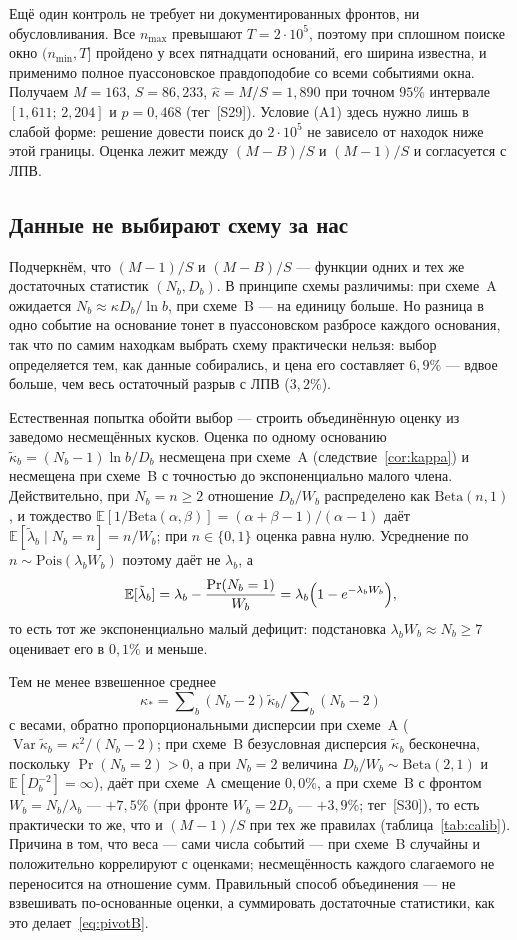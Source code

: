 \documentclass[11pt,a4paper]{article}
\theoremstyle{plain}
\theoremstyle{remark}
\begin{document}
Ещё один контроль не требует ни документированных фронтов, ни обусловливания. Все
$n_{\max}$ превышают $T=2\cdot10^5$, поэтому при сплошном поиске окно
$(n_{\min},T]$ пройдено у всех пятнадцати оснований, его ширина известна, и
применимо полное пуассоновское правдоподобие со всеми событиями окна. Получаем
$M=163$, $S=86{,}233$, $\hat\kappa=M/S=1{,}890$ при точном $95\%$ интервале
$[1{,}611;\,2{,}204]$ и $p=0{,}468$ (тег~[S29]). Условие (A1) здесь нужно лишь в
слабой форме: решение довести поиск до $2\cdot10^5$ не зависело от находок ниже
этой границы. Оценка лежит между $(M-B)/S$ и $(M-1)/S$ и согласуется с ЛПВ.

\subsection{Данные не выбирают схему за нас}\label{sec:noescape}

Подчеркнём, что $(M-1)/S$ и $(M-B)/S$ --- функции одних и тех же достаточных статистик
$(N_b,D_b)$. В принципе схемы различимы: при схеме~A ожидается
$N_b\approx\kappa D_b/\ln b$, при схеме~B --- на единицу больше. Но разница в одно
событие на основание тонет в пуассоновском разбросе каждого основания, так что по
самим находкам выбрать схему практически нельзя: выбор определяется тем, как данные
собирались, и цена его составляет $6{,}9\%$ --- вдвое больше, чем весь остаточный
разрыв с ЛПВ ($3{,}2\%$).

Естественная попытка обойти выбор --- строить объединённую оценку из заведомо
несмещённых кусков.
Оценка по одному основанию $\tilde\kappa_b=(N_b-1)\ln b/D_b$ несмещена при схеме~A
(следствие~\ref{cor:kappa}) и несмещена при схеме~B с точностью до экспоненциально
малого члена. Действительно, при $N_b=n\ge2$ отношение $D_b/W_b$ распределено как
$\mathrm{Beta}(n,1)$, и тождество
$\mathbb E[1/\mathrm{Beta}(\alpha,\beta)]=(\alpha+\beta-1)/(\alpha-1)$ даёт
$\mathbb E[\tilde\lambda_b\mid N_b=n]=n/W_b$; при $n\in\{0,1\}$ оценка равна нулю.
Усреднение по $n\sim\mathrm{Pois}(\lambda_bW_b)$ поэтому даёт не $\lambda_b$, а
\[
  \mathbb E[\tilde\lambda_b]=\lambda_b-\frac{\Pr(N_b=1)}{W_b}
  =\lambda_b\Bigl(1-e^{-\lambda_bW_b}\Bigr),
\]
то есть тот же экспоненциально малый дефицит: подстановка
$\lambda_bW_b\approx N_b\ge7$ оценивает его в $0{,}1\%$ и меньше.

Тем не менее взвешенное среднее
$$\kappa_\ast=\sum\nolimits_b(N_b-2)\tilde\kappa_b\Big/\sum\nolimits_b(N_b-2)$$
с весами, обратно пропорциональными дисперсии при схеме~A
($\operatorname{Var}\tilde\kappa_b=\kappa^2/(N_b-2)$; при схеме~B безусловная
дисперсия $\tilde\kappa_b$ бесконечна, поскольку $\Pr(N_b=2)>0$, а при $N_b=2$
величина $D_b/W_b\sim\mathrm{Beta}(2,1)$ и $\mathbb E[D_b^{-2}]=\infty$), даёт при
схеме~A смещение $0{,}0\%$, а при схеме~B с фронтом $W_b=N_b/\lambda_b$ ---
$+7{,}5\%$ (при фронте $W_b=2D_b$ --- $+3{,}9\%$; тег~[S30]), то есть практически то
же, что и $(M-1)/S$ при тех же правилах (таблица~\ref{tab:calib}). Причина в том,
что веса --- сами числа событий --- при схеме~B случайны и положительно коррелируют с
оценками; несмещённость каждого слагаемого не переносится на отношение сумм.
Правильный способ объединения --- не взвешивать по-основанные оценки, а
суммировать достаточные статистики, как это делает~\eqref{eq:pivotB}.
\end{document}
